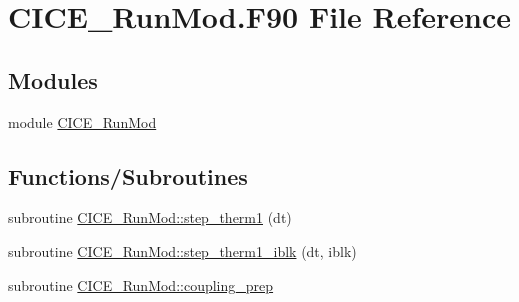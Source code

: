 \hypertarget{CICE__RunMod_8F90}{
\section{CICE\_\-RunMod.F90 File Reference}
\label{CICE__RunMod_8F90}
}
\subsection*{Modules}
\begin{DoxyCompactItemize}
\item 
module \hyperlink{namespaceCICE__RunMod}{CICE\_\-RunMod}
\end{DoxyCompactItemize}
\subsection*{Functions/Subroutines}
\begin{DoxyCompactItemize}
\item 
subroutine \hyperlink{namespaceCICE__RunMod_a82d80aca1f05476da48020976c7c6167}{CICE\_\-RunMod::step\_\-therm1} (dt)
\item 
subroutine \hyperlink{namespaceCICE__RunMod_a111ec6740d3c04411c4a93a7d7c129bf}{CICE\_\-RunMod::step\_\-therm1\_\-iblk} (dt, iblk)
\item 
subroutine \hyperlink{namespaceCICE__RunMod_abf11b85df210128b2304fac42127a723}{CICE\_\-RunMod::coupling\_\-prep}
\end{DoxyCompactItemize}
